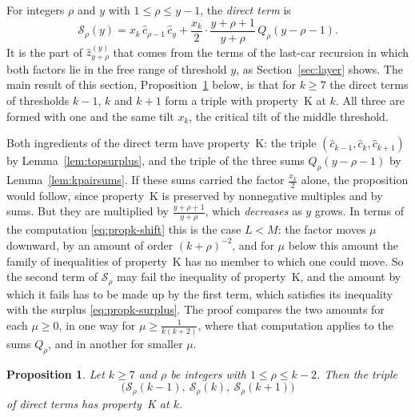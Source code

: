 \documentclass{amsart}
\newtheorem{proposition}[theorem]{Proposition}
\theoremstyle{definition}
\theoremstyle{remark}
\numberwithin{equation}{section}
\begin{document}
For integers $\rho$ and $y$ with $1\le\rho\le y-1$, the \emph{direct term} is
\[
\mathcal S_\rho(y)=x_k\,\hat c_{\rho-1}\,\hat c_y+\frac{x_k}{2}\cdot\frac{y+\rho+1}{y+\rho}\,Q_\rho(y-\rho-1).
\]
It is the part of $\hat z^{(y)}_{y+\rho}$ that comes from the terms of the last-car recursion in which both factors lie in the free range of threshold $y$, as Section~\ref{sec:layer} shows. The main result of this section, Proposition~\ref{prop:kdirect} below, is that for $k\ge 7$ the direct terms of thresholds $k-1$, $k$ and $k+1$ form a triple with property~K at $k$. All three are formed with one and the same tilt $x_k$, the critical tilt of the middle threshold.

Both ingredients of the direct term have property~K: the triple $(\hat c_{k-1},\hat c_k,\hat c_{k+1})$ by Lemma~\ref{lem:topsurplus}, and the triple of the three sums $Q_\rho(y-\rho-1)$ by Lemma~\ref{lem:kpairsums}. If these sums carried the factor $\frac{x_k}{2}$ alone, the proposition would follow, since property~K is preserved by nonnegative multiples and by sums. But they are multiplied by $\frac{y+\rho+1}{y+\rho}$, which \emph{decreases} as $y$ grows. In terms of the computation \eqref{eq:propk-shift} this is the case $L<M$: the factor moves $\mu$ downward, by an amount of order $(k+\rho)^{-2}$, and for $\mu$ below this amount the family of inequalities of property~K has no member to which one could move. So the second term of $\mathcal S_\rho$ may fail the inequality of property~K, and the amount by which it fails has to be made up by the first term, which satisfies its inequality with the surplus \eqref{eq:propk-surplus}. The proof compares the two amounts for each $\mu\ge 0$, in one way for $\mu\ge\frac{1}{k(k+2)}$, where that computation applies to the sums $Q_\rho$, and in another for smaller $\mu$.

\begin{proposition}\label{prop:kdirect}
Let $k\ge 7$ and $\rho$ be integers with $1\le\rho\le k-2$. Then the triple
\[
\bigl(\mathcal S_\rho(k-1),\ \mathcal S_\rho(k),\ \mathcal S_\rho(k+1)\bigr)
\]
of direct terms has property~K at $k$.
\end{proposition}
\end{document}
